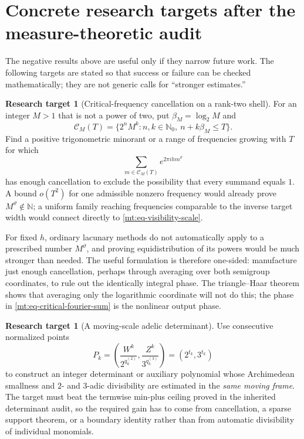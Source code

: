 \documentclass[11pt,oneside]{article}
\theoremstyle{definition}
\newtheorem{target}[theorem]{Research target}
\theoremstyle{remark}
\newcommand{\N}{\mathbb N}
\newcommand{\Nzero}{\mathbb N_0}
\newcommand{\thetaq}{\vartheta}
\begin{document}
\section{Concrete research targets after the measure-theoretic audit}
\label{mt:sec-research-targets}

The negative results above are useful only if they narrow future work.  The following targets
are stated so that success or failure can be checked mathematically; they are not generic calls
for ``stronger estimates.''

\begin{target}[Critical-frequency cancellation on a rank-two shell]
\label{mt:target-critical-fourier}
For an integer $M>1$ that is not a power of two, put $\beta_M=\log_2M$ and
\begin{equation}
 \mathcal C_M(T)=
 \{2^nM^k:n,k\in\Nzero,\ n+k\beta_M\le T\}.
 \label{mt:eq-CMT}
\end{equation}
Find a positive trigonometric minorant or a range of frequencies growing with $T$ for which
\begin{equation}
 \sum_{m\in\mathcal C_M(T)}e^{2\pi ihm^{\thetaq}}
 \label{mt:eq-critical-fourier-sum}
\end{equation}
has enough cancellation to exclude the possibility that every summand equals $1$.  A bound
$o(T^2)$ for one admissible nonzero frequency would already prove
$M^{\thetaq}\notin\N$; a uniform family reaching frequencies comparable to the inverse target
width would connect directly to \eqref{mt:eq-visibility-scale}.
\end{target}

For fixed $h$, ordinary lacunary methods do not automatically apply to a prescribed number
$M^{\thetaq}$, and proving equidistribution of its powers would be much stronger than needed.
The useful formulation is therefore one-sided: manufacture just enough cancellation, perhaps
through averaging over both semigroup coordinates, to rule out the identically integral
phase.  The triangle--Haar theorem shows that averaging only the logarithmic coordinate will
not do this; the phase in \eqref{mt:eq-critical-fourier-sum} is the nonlinear output phase.

\begin{target}[A moving-scale adelic determinant]
\label{mt:target-adelic-determinant}
Use consecutive normalized points
\begin{equation}
 P_k=\left(\frac{W^k}{2^{q^{(2)}_k}},
           \frac{Z^k}{3^{q^{(3)}_k}}\right)
     =(2^{t_k},3^{t_k})
 \label{mt:eq-Pk-moving}
\end{equation}
to construct an integer determinant or auxiliary polynomial whose Archimedean smallness and
$2$- and $3$-adic divisibility are estimated in the \emph{same moving frame}.  The target must
beat the termwise min-plus ceiling proved in the inherited determinant audit, so the required
gain has to come from cancellation, a sparse support theorem, or a boundary identity rather
than from automatic divisibility of individual monomials.
\end{target}
\end{document}
